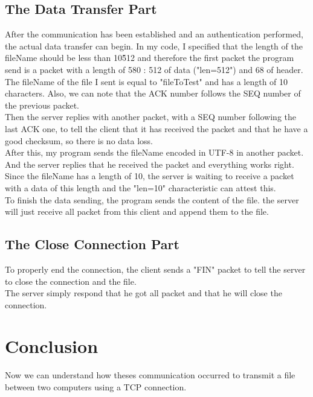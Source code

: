 \documentclass[a4paper]{article}
\begin{document}
\subsection{The Data Transfer Part}

After the communication has been established and an authentication performed, the actual data transfer can begin.
In my code, I specified that the length of the fileName should be less than 10\^512 and therefore the first packet the program send is a packet with a length of 580 : 512 of data ("len=512") and 68 of header. 
The fileName of the file I sent is equal to "fileToTest" and has a length of 10 characters.
Also, we can note that the ACK number follows the SEQ number of the previous packet.
\\
Then the server replies with another packet, with a SEQ number following the last ACK one, to tell the client that it has received the packet and that he have a good checksum, so there is no data loss.
\\
After this, my program sends the fileName encoded in UTF-8 in another packet. And the server replies that he received the packet and everything works right. Since the fileName has a length of 10, the server is waiting to receive a packet with a data of this length and the "len=10" characteristic can attest this. 
\\
To finish the data sending, the program sends the content of the file. the server will just receive all packet from this client and append them to the file.

\subsection{The Close Connection Part}

To properly end the connection, the client sends a "FIN" packet to tell the server to close the connection and the file.
\\
The server simply respond that he got all packet and that he will close the connection.

\section{Conclusion}

Now we can understand how theses communication occurred to transmit a file between two computers using a TCP connection.

\newpage
\listoffigures
\end{document}

